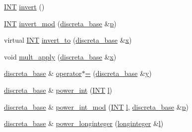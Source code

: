 \begin{DoxyCompactItemize}
\item 
\mbox{\hyperlink{galois_8h_a09fddde158a3a20bd2dcadb609de11dc}{I\+NT}} \mbox{\hyperlink{classdiscreta__base_a3c415a064ce76e183f000912875dea74}{invert}} ()
\item 
\mbox{\hyperlink{galois_8h_a09fddde158a3a20bd2dcadb609de11dc}{I\+NT}} \mbox{\hyperlink{classdiscreta__base_ae730a9ba3ebdb5ac13685ea86d93aec0}{invert\+\_\+mod}} (\mbox{\hyperlink{classdiscreta__base}{discreta\+\_\+base}} \&\mbox{\hyperlink{alphabet2_8_c_a533391314665d6bf1b5575e9a9cd8552}{p}})
\item 
virtual \mbox{\hyperlink{galois_8h_a09fddde158a3a20bd2dcadb609de11dc}{I\+NT}} \mbox{\hyperlink{classdiscreta__base_a874a5ffb467f3896604a3c9bdf0cca50}{invert\+\_\+to}} (\mbox{\hyperlink{classdiscreta__base}{discreta\+\_\+base}} \&\mbox{\hyperlink{alphabet2_8_c_a6150e0515f7202e2fb518f7206ed97dc}{x}})
\item 
void \mbox{\hyperlink{classdiscreta__base_a301b8d0527d3a60ba410bba87446f490}{mult\+\_\+apply}} (\mbox{\hyperlink{classdiscreta__base}{discreta\+\_\+base}} \&\mbox{\hyperlink{alphabet2_8_c_a6150e0515f7202e2fb518f7206ed97dc}{x}})
\item 
\mbox{\hyperlink{classdiscreta__base}{discreta\+\_\+base}} \& \mbox{\hyperlink{classdiscreta__base_a26a19fcfe00422fe1d8a66d5b1b4a60a}{operator$\ast$=}} (\mbox{\hyperlink{classdiscreta__base}{discreta\+\_\+base}} \&\mbox{\hyperlink{alphabet2_8_c_a0a2f84ed7838f07779ae24c5a9086d33}{y}})
\item 
\mbox{\hyperlink{classdiscreta__base}{discreta\+\_\+base}} \& \mbox{\hyperlink{classdiscreta__base_a4b7be615dfc1a72b6c6a623325e77628}{power\+\_\+int}} (\mbox{\hyperlink{galois_8h_a09fddde158a3a20bd2dcadb609de11dc}{I\+NT}} \mbox{\hyperlink{alphabet2_8_c_a89606eca6b563ec68d2da2e84657736f}{l}})
\item 
\mbox{\hyperlink{classdiscreta__base}{discreta\+\_\+base}} \& \mbox{\hyperlink{classdiscreta__base_abbedc6f882b55fe0b98dec33da832f8e}{power\+\_\+int\+\_\+mod}} (\mbox{\hyperlink{galois_8h_a09fddde158a3a20bd2dcadb609de11dc}{I\+NT}} \mbox{\hyperlink{alphabet2_8_c_a89606eca6b563ec68d2da2e84657736f}{l}}, \mbox{\hyperlink{classdiscreta__base}{discreta\+\_\+base}} \&\mbox{\hyperlink{alphabet2_8_c_a533391314665d6bf1b5575e9a9cd8552}{p}})
\item 
\mbox{\hyperlink{classdiscreta__base}{discreta\+\_\+base}} \& \mbox{\hyperlink{classdiscreta__base_aa62919063915230ba88a0a070a38f3d6}{power\+\_\+longinteger}} (\mbox{\hyperlink{classlonginteger}{longinteger}} \&\mbox{\hyperlink{alphabet2_8_c_a89606eca6b563ec68d2da2e84657736f}{l}})

\end{DoxyCompactItemize}
